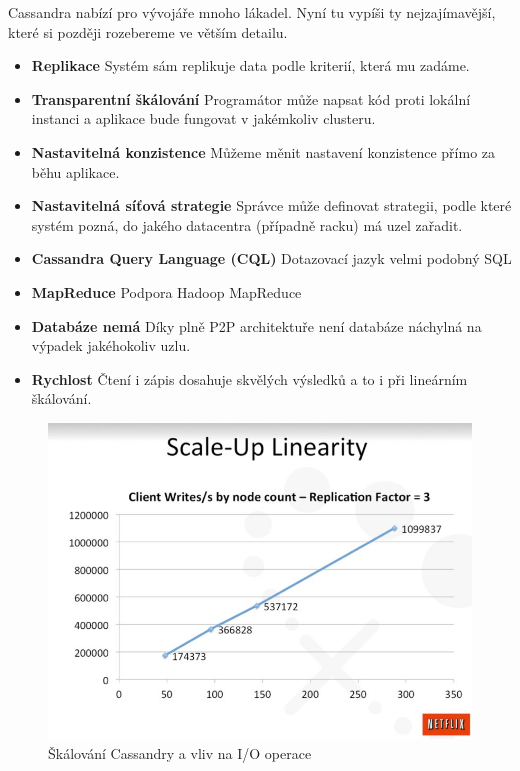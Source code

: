Cassandra nabízí pro vývojáře mnoho lákadel. Nyní tu vypíši ty nejzajímavější, které si později rozebereme ve větším detailu. 

\begin{itemize}
\item \textbf{Replikace} Systém sám replikuje data podle kriterií, která mu zadáme.
\item \textbf{Transparentní škálování} Programátor může napsat kód proti lokální instanci a aplikace bude fungovat v jakémkoliv clusteru.
\item \textbf{Nastavitelná konzistence} Můžeme měnit nastavení konzistence přímo za běhu aplikace.
\item \textbf{Nastavitelná síťová strategie} Správce může definovat strategii, podle které systém pozná, do jakého datacentra (případně racku) má uzel zařadit.
\item \textbf{Cassandra Query Language (CQL)} Dotazovací jazyk velmi podobný SQL
\item \textbf{MapReduce} Podpora Hadoop MapReduce
\item \textbf{Databáze nemá } Díky plně P2P architektuře není databáze náchylná na výpadek jakéhokoliv uzlu.
\item \textbf{Rychlost} Čtení i zápis dosahuje skvělých výsledků \cite{benchmark} a to i při lineárním škálování. 
\end{itemize} 

\begin{figure}[h]
\centering
\includegraphics[scale=0.5]{images/netflix}
\caption{Škálování Cassandry a vliv na I/O operace}
\label{fig:scaleup}
\end{figure}

